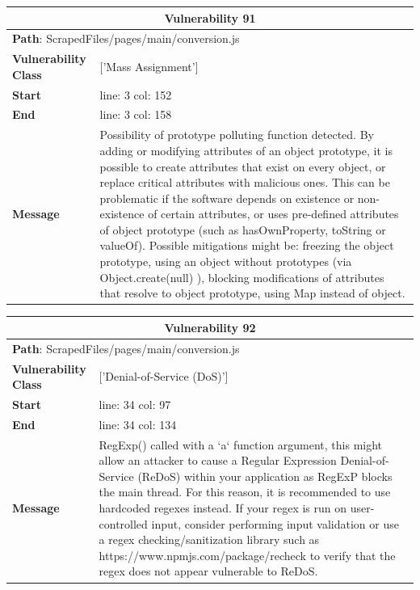 \documentclass[12pt]{article}
\begin{document}
\vspace{0.7cm}
\FloatBarrier
\begin{table}[!h]
\centering
\renewcommand{\arraystretch}{1.3}
\begin{tabular}{|l|p{10cm}|}
\hline
\multicolumn{2}{|c|}{\textbf{Vulnerability 91}} \\
\hline
\multicolumn{2}{|l|}{\textbf{Path}: ScrapedFiles/pages/main/conversion.js} \\
\hline
\textbf{Vulnerability Class} & ['Mass Assignment'] \\
\hline
\textbf{Start} & line: 3 \quad col: 152 \\
\hline
\textbf{End} & line: 3 \quad col: 158 \\
\hline
\textbf{Message} & Possibility of prototype polluting function detected. By adding or modifying attributes of an object prototype, it is possible to create attributes that exist on every object, or replace critical attributes with malicious ones. This can be problematic if the software depends on existence or non-existence of certain attributes, or uses pre-defined attributes of object prototype (such as hasOwnProperty, toString or valueOf). Possible mitigations might be: freezing the object prototype, using an object without prototypes (via Object.create(null) ), blocking modifications of attributes that resolve to object prototype, using Map instead of object. \\
\hline
\end{tabular}
\end{table}
\vspace{0.7cm}
\FloatBarrier
\begin{table}[!h]
\centering
\renewcommand{\arraystretch}{1.3}
\begin{tabular}{|l|p{10cm}|}
\hline
\multicolumn{2}{|c|}{\textbf{Vulnerability 92}} \\
\hline
\multicolumn{2}{|l|}{\textbf{Path}: ScrapedFiles/pages/main/conversion.js} \\
\hline
\textbf{Vulnerability Class} & ['Denial-of-Service (DoS)'] \\
\hline
\textbf{Start} & line: 34 \quad col: 97 \\
\hline
\textbf{End} & line: 34 \quad col: 134 \\
\hline
\textbf{Message} & RegExp() called with a `a` function argument, this might allow an attacker to cause a Regular Expression Denial-of-Service (ReDoS) within your application as RegExP blocks the main thread. For this reason, it is recommended to use hardcoded regexes instead. If your regex is run on user-controlled input, consider performing input validation or use a regex checking/sanitization library such as https://www.npmjs.com/package/recheck to verify that the regex does not appear vulnerable to ReDoS. \\
\hline
\end{tabular}
\end{table}
\end{document}
